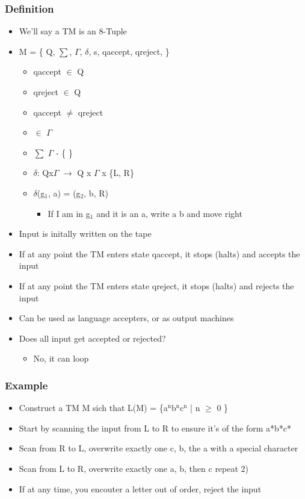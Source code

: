 \documentclass[11pt]{article}
\begin{document}
\subsubsection{Definition}
\label{sec:orgca50c36}
\begin{itemize}
\item We'll say a TM is an 8-Tuple
\item M = \{ Q, \(\sum\), \(\Gamma\), \(\delta\), s, qaccept, qreject, \square \}
\begin{itemize}
\item qaccept \(\in\) Q
\item qreject \(\in\) Q
\item qaccept \(\ne\) qreject
\item \square \(\in\) \(\Gamma\)
\item \(\sum\) \subseteq \(\Gamma\) - \{ \square \}
\item \(\delta\): Qx\(\Gamma\) \(\rightarrow\) Q x \(\Gamma\) x \{L, R\}
\item \(\delta\)(g\(_{\text{1}}\), a) = (g\(_{\text{2}}\), b, R)
\begin{itemize}
\item If I am in g\(_{\text{1}}\) and it is an a, write a b and move right
\end{itemize}
\end{itemize}
\item Input is initally written on the tape
\item If at any point the TM enters state qaccept, it stops (halts) and accepts the input
\item If at any point the TM enters state qreject, it stops (halts) and rejects the input
\item Can be used as language accepters, or as output machines
\item Does all input get accepted or rejected?
\begin{itemize}
\item No, it can loop
\end{itemize}
\end{itemize}
\subsubsection{Example}
\label{sec:org635977f}
\begin{itemize}
\item Construct a TM M sich that L(M) = \{a\(^{\text{n}}\)b\(^{\text{n}}\)c\(^{\text{n}}\) | n \(\ge\) 0 \}
\item Start by scanning the input from L to R to ensure it's of the form a*b*c*
\item Scan from R to L, overwrite exactly one c, b, the a with a special character
\item Scan from L to R, overwrite exactly one a, b, then c repeat 2)
\item If at any time, you encouter a letter out of order, reject the input
\end{itemize}
\end{document}
